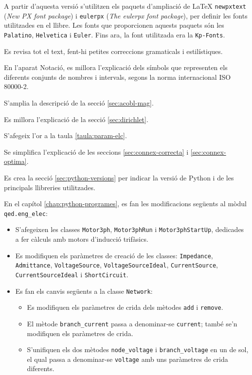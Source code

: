 A partir d'aquesta versió s'utilitzen els paquets d'ampliació de \LaTeX{}
\texttt{newpxtext} (\textit{New PX font package}) i \texttt{eulerpx} (\textit{The eulerpx font package}), per definir les fonts utilitzades en el llibre. Les fonts que proporcionen aquests paquets són les \texttt{Palatino}, \texttt{Helvetica} i \AmS{} \texttt{Euler}.
Fins ara, la font utilitzada era la \texttt{Kp-Fonts}.

Es revisa tot el text, fent-hi petites correccions gramaticals i estilístiques.

En l'aparat Notació, es millora l'explicació dels símbols que representen els diferents conjunts de nombres i intervals, segons la norma internacional ISO 80000-2.

S'amplia la descripció de la secció \ref{sec:acobl-mag}.

Es millora l'explicació de la secció \ref{sec:dirichlet}.

S'afegeix l'or a la taula \ref{taula:param-elc}.

Se simplifica l'explicació de les seccions \ref{sec:connex-correcta} i \ref{sec:connex-optima}.

Es crea la secció \ref{sec:python-versions} per indicar la versió de Python i de les principals llibreries utilitzades. 


En el capítol \ref{chap:python-programes}, es fan les modificacions següents al mòdul  \texttt{qed.eng\_elec}:
\begin{itemize}
	\item S'afegeixen les classes  \texttt{Motor3ph}, \texttt{Motor3phRun} i 
	\texttt{Motor3phStartUp}, dedicades a fer càlculs amb motors d'inducció trifàsics.
	\item Es modifiquen els paràmetres de creació de les classes: \texttt{Impedance}, \texttt{Admittance}, \texttt{VoltageSource}, \texttt{VoltageSourceIdeal}, \texttt{CurrentSource}, \texttt{CurrentSourceIdeal} i \texttt{ShortCircuit}.
	\item Es fan els canvis següents a la classe \texttt{Network}:
	\begin{itemize}
		\item Es modifiquen els paràmetres de crida dels mètodes \texttt{add} i \texttt{remove}.
		\item  El mètode \texttt{branch\_current} passa a denominar-se \texttt{current}; també se'n modifiquen els paràmetres de crida.
		\item S'unifiquen els dos mètodes \texttt{node\_voltage} i \texttt{branch\_voltage} en un de sol, el qual passa a denominar-se \texttt{voltage} amb uns paràmetres de crida diferents. 
	\end{itemize}
\end{itemize}

